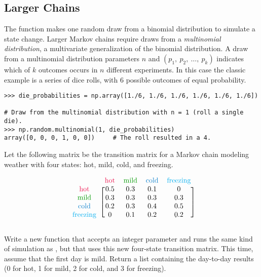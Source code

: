 \subsection*{Larger Chains} %

The  function makes one random draw from a binomial distribution to simulate a state change.
Larger Markov chains require draws from a \emph{multinomial distribution}, a multivariate generalization of the binomial distribution.
A draw from a multinomial distribution parameters $n$ and $(p_1,\ p_2,\ \ldots,\ p_k)$ indicates which of $k$ outcomes occurs in $n$ different experiments.
In this case the classic example is a series of dice rolls, with $6$ possible outcomes of equal probability.

\begin{lstlisting}
>>> die_probabilities = np.array([1./6, 1./6, 1./6, 1./6, 1./6, 1./6])

# Draw from the multinomial distribution with n = 1 (roll a single die).
>>> np.random.multinomial(1, die_probabilities)
array([0, 0, 0, 1, 0, 0])     # The roll resulted in a 4.
\end{lstlisting}

\begin{problem} %
Let the following matrix be the transition matrix for a Markov chain modeling weather with four states: hot, mild, cold, and freezing.

\begin{align*}
\begin{blockarray}{ccccc}
& \text{\textcolor{red}{hot}} & \text{\textcolor[rgb]{0,.6,0}{mild}} & \text{\textcolor{blue}{cold}} & \text{\textcolor{cyan}{freezing}} \\
\begin{block}{c[cccc]}
\text{\textcolor{red}{hot}}              & 0.5 & 0.3 & 0.1 & 0   \\
\text{\textcolor[rgb]{0,.6,0}{mild}}     & 0.3 & 0.3 & 0.3 & 0.3 \\
\text{\textcolor{blue}{cold}}            & 0.2 & 0.3 & 0.4 & 0.5 \\
\text{\textcolor{cyan}{freezing}}        &   0 & 0.1 & 0.2 & 0.2 \\
\end{block}\end{blockarray}
\end{align*}

Write a new function that accepts an integer parameter and runs the same kind of simulation as , but that uses this new four-state transition matrix.
This time, assume that the first day is mild.
Return a list containing the day-to-day results (0 for hot, 1 for mild, 2 for cold, and 3 for freezing).
\label{prob:markov-larger-chain}
\end{problem}

